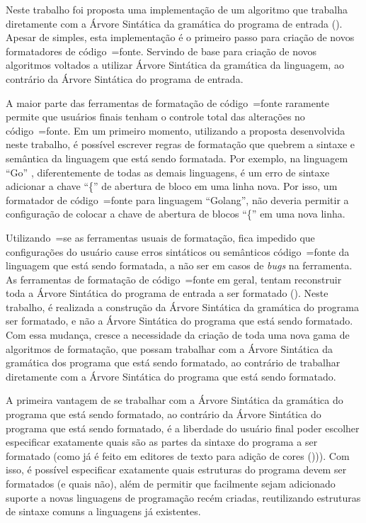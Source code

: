 Neste trabalho foi proposta uma implementação de um algoritmo que trabalha diretamente com a Árvore Sintática da gramática do programa de entrada ().
Apesar de simples,
esta implementação é o primeiro passo para criação de novos formatadores de código~=fonte.
Servindo de base para criação de novos algoritmos voltados a utilizar Árvore Sintática da gramática da linguagem,
ao contrário da Árvore Sintática do programa de entrada.

A maior parte das ferramentas de formatação de código~=fonte raramente permite que usuários finais tenham o controle total das alterações no código~=fonte.
Em um primeiro momento,
utilizando a proposta desenvolvida neste trabalho,
é possível escrever regras de formatação que quebrem a sintaxe e
semântica da linguagem que está sendo formatada.
Por exemplo,
na linguagem ``Go'' \cite{programmingLanguageGolang},
diferentemente de todas as demais linguagens,
é um erro de sintaxe adicionar a chave ``\{'' de abertura de bloco em uma linha nova.
Por isso,
um formatador de código~=fonte para linguagem ``Golang'',
não deveria permitir a configuração de colocar a chave de abertura de blocos ``\{'' em uma nova linha.

Utilizando~=se as ferramentas usuais de formatação,
fica impedido que configurações do usuário cause erros sintáticos ou
semânticos código~=fonte da linguagem que está sendo formatada,
a não ser em casos de \textit{bugs} na ferramenta.
As ferramentas de formatação de código~=fonte em geral,
tentam reconstruir toda a Árvore Sintática do programa de entrada a ser formatado ().
Neste trabalho,
é realizada a construção da Árvore Sintática da gramática do programa ser formatado,
e não a Árvore Sintática do programa que está sendo formatado.
Com essa mudança,
cresce a necessidade da criação de toda uma nova gama de algoritmos de formatação,
que possam trabalhar com a Árvore Sintática da gramática dos programa que está sendo formatado,
ao contrário de trabalhar diretamente com a Árvore Sintática do programa que está sendo formatado.

A primeira vantagem de se trabalhar com a Árvore Sintática da gramática do programa que está sendo formatado,
ao contrário da Árvore Sintática do programa que está sendo formatado,
é a liberdade do usuário final poder escolher especificar exatamente quais são as partes da sintaxe do programa a ser formatado (como já é feito em editores de texto para adição de cores ())).
Com isso,
é possível especificar exatamente quais estruturas do programa devem ser formatados (e quais não),
além de permitir que facilmente sejam adicionado suporte a novas linguagens de programação recém criadas,
reutilizando estruturas de sintaxe comuns a linguagens já existentes.

